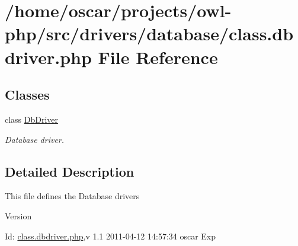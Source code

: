 \section{/home/oscar/projects/owl-\/php/src/drivers/database/class.dbdriver.php File Reference}
\label{class_8dbdriver_8php}
\subsection*{Classes}
\begin{DoxyCompactItemize}
\item 
class \hyperlink{classDbDriver}{DbDriver}
\begin{DoxyCompactList}\small\item\em Database driver. \item\end{DoxyCompactList}\end{DoxyCompactItemize}


\subsection{Detailed Description}
This file defines the Database drivers \begin{DoxyVersion}{Version}

\end{DoxyVersion}
\begin{DoxyParagraph}{Id:}
\hyperlink{class_8dbdriver_8php}{class.dbdriver.php},v 1.1 2011-\/04-\/12 14:57:34 oscar Exp 
\end{DoxyParagraph}

